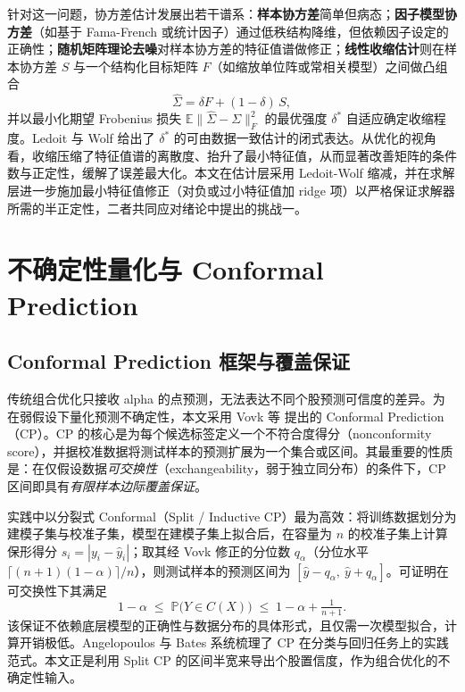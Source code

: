针对这一问题，协方差估计发展出若干谱系：\textbf{样本协方差}简单但病态；\textbf{因子模型协方差}（如基于 Fama-French 或统计因子）通过低秩结构降维，但依赖因子设定的正确性；\textbf{随机矩阵理论去噪}对样本协方差的特征值谱做修正；\textbf{线性收缩估计}则在样本协方差 $S$ 与一个结构化目标矩阵 $F$（如缩放单位阵或常相关模型）之间做凸组合
\begin{equation}
\hat\Sigma = \delta F + (1-\delta)\,S,
\end{equation}
并以最小化期望 Frobenius 损失 $\mathbb{E}\lVert\hat\Sigma-\Sigma\rVert_F^2$ 的最优强度 $\delta^{*}$ 自适应确定收缩程度。Ledoit 与 Wolf\cite{Ledoit2004} 给出了 $\delta^{*}$ 的可由数据一致估计的闭式表达。从优化的视角看，收缩压缩了特征值谱的离散度、抬升了最小特征值，从而显著改善矩阵的条件数与正定性，缓解了误差最大化。本文在估计层采用 Ledoit-Wolf 缩减，并在求解层进一步施加最小特征值修正（对负或过小特征值加 ridge 项）以严格保证求解器所需的半正定性，二者共同应对绪论中提出的挑战一。

\section{不确定性量化与 Conformal Prediction}
\label{sec:bg_cp}

\subsection{Conformal Prediction 框架与覆盖保证}
传统组合优化只接收 alpha 的点预测，无法表达不同个股预测可信度的差异。为在弱假设下量化预测不确定性，本文采用 Vovk 等\cite{Vovk2005Conformal} 提出的 Conformal Prediction（CP）。CP 的核心是为每个候选标签定义一个不符合度得分（nonconformity score），并据校准数据将测试样本的预测扩展为一个集合或区间。其最重要的性质是：在仅假设数据\emph{可交换性}（exchangeability，弱于独立同分布）的条件下，CP 区间即具有\emph{有限样本边际覆盖保证}。

实践中以分裂式 Conformal（Split / Inductive CP）最为高效：将训练数据划分为建模子集与校准子集，模型在建模子集上拟合后，在容量为 $n$ 的校准子集上计算保形得分 $s_i = |y_i - \hat y_i|$；取其经 Vovk 修正的分位数 $q_\alpha$（分位水平 $\lceil (n+1)(1-\alpha)\rceil / n$），则测试样本的预测区间为 $[\hat y - q_\alpha,\ \hat y + q_\alpha]$。可证明在可交换性下其满足
\begin{equation}
1-\alpha \;\le\; \mathbb{P}\big(Y\in C(X)\big) \;\le\; 1-\alpha + \tfrac{1}{n+1}.
\end{equation}
该保证不依赖底层模型的正确性与数据分布的具体形式，且仅需一次模型拟合，计算开销极低。Angelopoulos 与 Bates\cite{Angelopoulos2021Gentle} 系统梳理了 CP 在分类与回归任务上的实践范式。本文正是利用 Split CP 的区间半宽来导出个股置信度，作为组合优化的不确定性输入。


